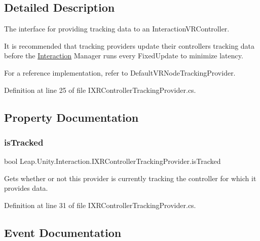 \subsection{Detailed Description}
The interface for providing tracking data to an Interaction\+V\+R\+Controller. 

It is recommended that tracking providers update their controllers\textquotesingle{} tracking data before the \mbox{\hyperlink{namespace_leap_1_1_unity_1_1_interaction}{Interaction}} Manager runs every Fixed\+Update to minimize latency.

For a reference implementation, refer to Default\+V\+R\+Node\+Tracking\+Provider. 

Definition at line 25 of file I\+X\+R\+Controller\+Tracking\+Provider.\+cs.



\subsection{Property Documentation}
\mbox{\label{interface_leap_1_1_unity_1_1_interaction_1_1_i_x_r_controller_tracking_provider_a7f6ac99e8fafd091151ed615626ddf1b}} 
\subsubsection{\texorpdfstring{isTracked}{isTracked}}
{\footnotesize\ttfamily bool Leap.\+Unity.\+Interaction.\+I\+X\+R\+Controller\+Tracking\+Provider.\+is\+Tracked\hspace{0.3cm}{\ttfamily [get]}}



Gets whether or not this provider is currently tracking the controller for which it provides data. 



Definition at line 31 of file I\+X\+R\+Controller\+Tracking\+Provider.\+cs.



\subsection{Event Documentation}
\mbox{\label{interface_leap_1_1_unity_1_1_interaction_1_1_i_x_r_controller_tracking_provider_a621b53b241147b7a9af4c3c58c15fba4}} 
